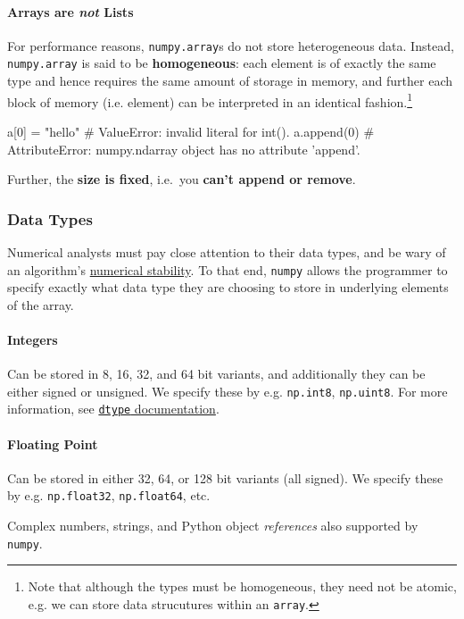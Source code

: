\documentclass[12pt,letterpaper,twoside]{article}
\begin{document}
\paragraph{Arrays are \emph{not} Lists}
For performance reasons, \texttt{numpy.array}s do not store
heterogeneous data.
Instead, \texttt{numpy.array} is said to be
\textbf{homogeneous}: each element is of exactly the same type and hence
requires the same amount of storage in memory, and further each block
of memory (i.e. element) can be interpreted in an identical
fashion.\footnote{Note that although the types must be homogeneous, they need
not be atomic, e.g. we can store data strucutures within an
\texttt{array}.}

\begin{python}
  a[0] = "hello"    # ValueError: invalid literal for int().
  a.append(0)       # AttributeError: numpy.ndarray object has no attribute 'append'.
\end{python}

Further, the \textbf{size is fixed}, i.e.~you \textbf{can't append or remove}.

\subsubsection{Data Types}
Numerical analysts must pay close attention to their data types, and
be wary of an algorithm's
\href{https://en.wikipedia.org/wiki/Numerical_stability}{numerical
  stability}. To that end, \texttt{numpy} allows the programmer to
specify exactly what data type they are choosing to store in
underlying elements of the array.

\paragraph{Integers}
Can be stored in 8, 16, 32, and 64 bit variants, and additionally they
can be either signed or unsigned. We specify these by
e.g. \texttt{np.int8}, \texttt{np.uint8}. For more information, see
\href{https://docs.scipy.org/doc/numpy/reference/arrays.dtypes.html}
{\texttt{dtype} documentation}.

\paragraph{Floating Point}
Can be stored in either 32, 64, or 128 bit variants (all signed). We
specify these by e.g. \texttt{np.float32}, \texttt{np.float64}, etc.

Complex numbers,
strings, and Python object \emph{references} also supported by \texttt{numpy}.
\end{document}
